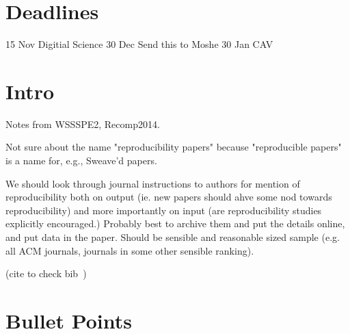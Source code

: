 \documentclass{article}
\begin{document}


\section{Deadlines}
15 Nov Digitial Science
30 Dec Send this to Moshe
30 Jan CAV

\section{Intro}

Notes from WSSSPE2, Recomp2014. 


Not sure about the name "reproducibility papers" because "reproducible
papers" is a name for, e.g., Sweave'd papers.

We should look through journal instructions to authors for mention of
reproducibility both on output (ie. new papers should ahve some nod
towards reproducibility) and more importantly on input (are
reproducibility studies explicitly encouraged.)  Probably best to
archive them and put the details online, and put data in the
paper. Should be sensible and reasonable sized sample (e.g. all ACM
journals, journals in some other sensible ranking).

(cite to check bib~\cite{crick-et-al_wssspe2})

\section{Bullet Points}
\end{document}
